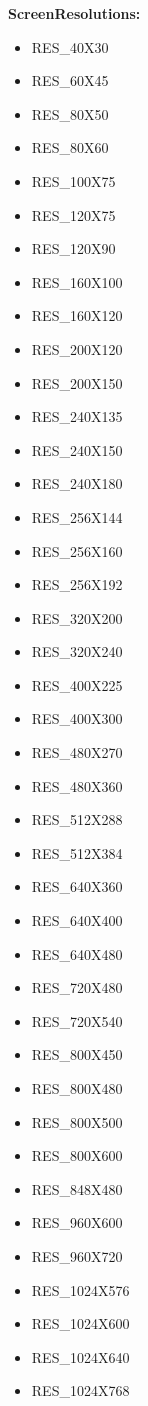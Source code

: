 \documentclass[english,bachelor,a4paper,twoside]{ppfcmthesis}
\begin{document}
\textbf{ScreenResolutions:}
\begin{itemize}
    \item RES\_40X30
    \item RES\_60X45
    \item RES\_80X50
    \item RES\_80X60
    \item RES\_100X75
    \item RES\_120X75
    \item RES\_120X90
    \item RES\_160X100
    \item RES\_160X120
    \item RES\_200X120
    \item RES\_200X150
    \item RES\_240X135
    \item RES\_240X150
    \item RES\_240X180
    \item RES\_256X144
    \item RES\_256X160
    \item RES\_256X192
    \item RES\_320X200
    \item RES\_320X240
    \item RES\_400X225
    \item RES\_400X300
    \item RES\_480X270
    \item RES\_480X360
    \item RES\_512X288
    \item RES\_512X384
    \item RES\_640X360
    \item RES\_640X400
    \item RES\_640X480
    \item RES\_720X480
    \item RES\_720X540
    \item RES\_800X450
    \item RES\_800X480
    \item RES\_800X500
    \item RES\_800X600
    \item RES\_848X480
    \item RES\_960X600
    \item RES\_960X720
    \item RES\_1024X576
    \item RES\_1024X600
    \item RES\_1024X640
    \item RES\_1024X768

\end{itemize}
\end{document}
